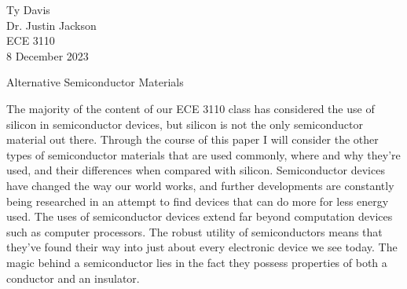 \documentclass[12pt]{article}
\begin{document}
\begin{flushleft}

Ty Davis\\
Dr. Justin Jackson\\
ECE 3110\\
8 December 2023\\


\begin{center}
  Alternative Semiconductor Materials
\end{center}



\setlength{\parindent}{0.5in}

The majority of the content of our ECE 3110 class
has considered the use of silicon in semiconductor
devices, but silicon is not the only semiconductor
material out there. Through the course of this paper
I will consider the other types of semiconductor
materials that are used commonly, where and why they're
used, and their differences when compared with
silicon. Semiconductor devices have changed the way
our world works, and further developments are constantly
being researched in an attempt to find devices that
can do more for less energy used. The uses of 
semiconductor devices extend far beyond computation
devices such as computer processors. The robust 
utility of semiconductors means that they've found
their way into just about every electronic device 
we see today. The magic behind a semiconductor lies
in the fact they possess properties of both a
conductor and an insulator. 











\newpage


\newpage
\nocite{*}
\printbibliography

\end{flushleft}
\end{document}
